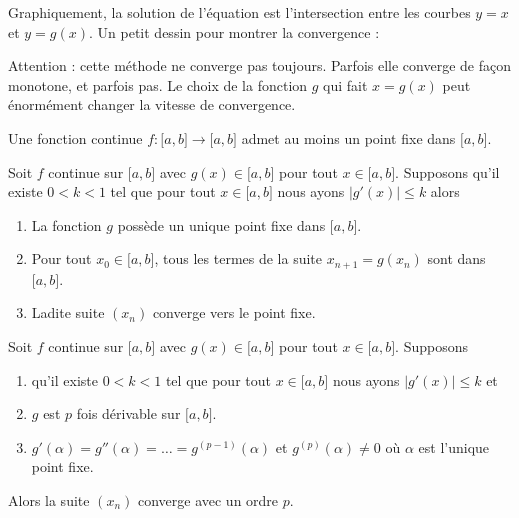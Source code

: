 Graphiquement, la solution de l'équation est l'intersection entre les courbes \( y=x\) et \( y=g(x)\). Un petit dessin pour montrer la convergence :

\begin{center}
   
\end{center}

Attention : cette méthode ne converge pas toujours. Parfois elle converge de façon monotone, et parfois pas. Le choix de la fonction \( g\) qui fait \( x=g(x)\) peut énormément changer la vitesse de convergence.

\begin{theorem}
    Une fonction continue \( f\colon \mathopen[ a , b \mathclose]\to \mathopen[ a , b \mathclose]\) admet au moins un point fixe dans \( \mathopen[ a , b \mathclose]\).
\end{theorem}

\begin{theorem}   
    Soit \( f\) continue sur \( \mathopen[ a , b \mathclose]\) avec \( g(x)\in\mathopen[ a , b \mathclose]\) pour tout \( x\in\mathopen[ a , b \mathclose]\). Supposons qu'il existe \( 0<k<1\) tel que pour tout \( x\in\mathopen[ a , b \mathclose]\) nous ayons \( | g'(x) |\leq k\) alors 
    \begin{enumerate}
        \item
            La fonction \( g\) possède un unique point fixe dans \( \mathopen[ a , b \mathclose]\).
        \item
            Pour tout \( x_0\in\mathopen[ a , b \mathclose]\), tous les termes de la suite \( x_{n+1}=g(x_n)\) sont dans \( \mathopen[ a , b \mathclose]\).
        \item
            Ladite suite \( (x_n)\) converge vers le point fixe.
    \end{enumerate}
\end{theorem}

\begin{theorem}
    Soit \( f\) continue sur \( \mathopen[ a , b \mathclose]\) avec \( g(x)\in\mathopen[ a , b \mathclose]\) pour tout \( x\in\mathopen[ a , b \mathclose]\). Supposons
    \begin{enumerate}
        \item
    qu'il existe \( 0<k<1\) tel que pour tout \( x\in\mathopen[ a , b \mathclose]\) nous ayons \( | g'(x) |\leq k\) et
\item
    \( g\) est \( p\) fois dérivable sur \( \mathopen[ a , b \mathclose]\).
\item
    \( g'(\alpha)=g''(\alpha)=\ldots=g^{(p-1)}(\alpha)\) et \( g^{(p)}(\alpha)\neq 0\) où \( \alpha\) est l'unique point fixe.
    \end{enumerate}
    Alors la suite \( (x_n)\) converge avec un ordre \( p\).
\end{theorem}



